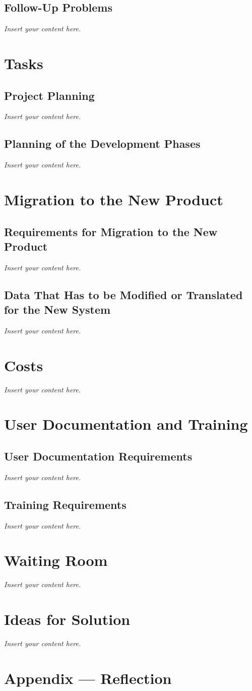 \documentclass[12pt]{article}
\newcommand{\lips}{\textit{Insert your content here.}}
\begin{document}
\subsection{Follow-Up Problems}
\lips

\section{Tasks}
\subsection{Project Planning}
\lips
\subsection{Planning of the Development Phases}
\lips

\section{Migration to the New Product}
\subsection{Requirements for Migration to the New Product}
\lips
\subsection{Data That Has to be Modified or Translated for the New System}
\lips

\section{Costs}
\lips
\section{User Documentation and Training}
\subsection{User Documentation Requirements}
\lips
\subsection{Training Requirements}
\lips

\section{Waiting Room}
\lips

\section{Ideas for Solution}
\lips

\newpage{}
\section*{Appendix --- Reflection}




\end{document}
